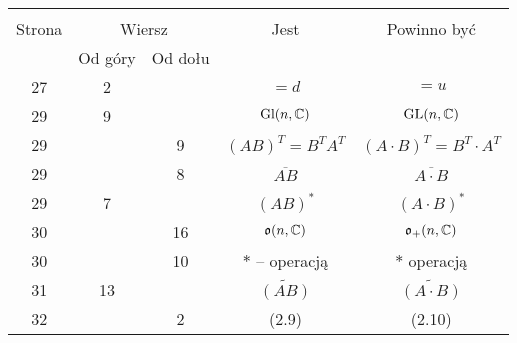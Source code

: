 \documentclass[a4paper,11pt]{article}
\begin{document}
\begin{center}
  \begin{tabular}{|c|c|c|c|c|}
    \hline
    & \multicolumn{2}{c|}{} & & \\
    Strona & \multicolumn{2}{c|}{Wiersz} & Jest
                              & Powinno być \\ \cline{2-3}
    & Od góry & Od dołu & & \\
    \hline
    27  &  2 & & $= d$ & $= u$ \\
    29  &  9 & & $\textrm{Gl}( n, \mathbb{C} )$ & $\mathrm{GL}( n, \mathbb{C} )$ \\
    29  & &  9 & $( A B )^{ T } = B^{ T } A^{ T }$
           & $( A \cdot B )^{ T } = B^{ T } \cdot A^{ T }$ \\
    29  & &  8 & $\overline{ A B }$ & $\overline{ A \cdot B }$ \\
    29  &  7 & & $( A B )^{ * }$ & $( A \cdot B )^{ * }$ \\
    30  & & 16 & $\mathfrak{o}( n, \mathbb{C} )$ & $\mathfrak{o}_{ + }( n, \mathbb{C} )$ \\
    30  & & 10 & $*$ -- operacją & $*$ operacją \\
    31  & 13 & & $\widetilde{ ( A B ) }$ & $\widetilde{ ( A \cdot B ) }$ \\
    32  & &  2 & (2.9) & (2.10) \\

\end{tabular}
\end{center}
\end{document}
